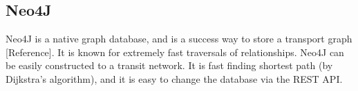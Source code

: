 \subsection{Neo4J}

Neo4J is a native graph database, and is a success way to store a transport graph [Reference]. It is known for extremely fast traversals of relationships. Neo4J can be easily constructed to a transit network. It is fast finding shortest path (by Dijkstra's algorithm), and it is easy to change the database via the REST API. 



